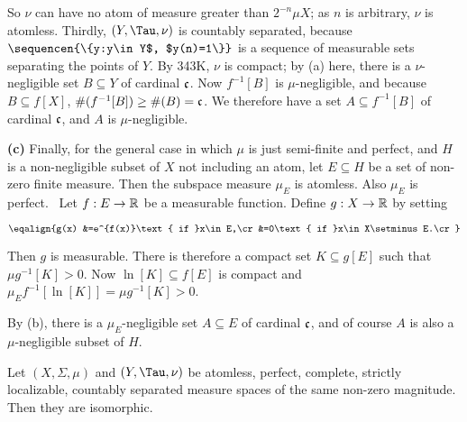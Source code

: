 {

\noindent So $\nu$ can have no atom of measure greater than $2^{-n}\mu X$; 
as $n$ is arbitrary, $\nu$ is atomless.   Thirdly, $(Y,\Tau,\nu)$ is
countably separated, because $\sequencen{\{y:y\in Y$, $y(n)=1\}}$ is a
sequence of measurable sets separating the points of $Y$.   By 343K, $\nu$
is compact;  by (a) here, there is a $\nu$-negligible set $B\subseteq Y$ of
cardinal $\frak c$.   Now $f^{-1}[B]$ is $\mu$-negligible, and because
$B\subseteq f[X]$, $\#(f^{-1}[B])\ge\#(B)=\frak c$.   We therefore have a
set $A\subseteq f^{-1}[B]$ of cardinal $\frak c$, and $A$ is
$\mu$-negligible.

\medskip

{\bf (c)} Finally, for the general case in which $\mu$ is just semi-finite
and perfect, and $H$ is a non-negligible subset of $X$ not including an
atom, let $E\subseteq H$ be a set of non-zero finite
measure.   Then the subspace measure $\mu_E$ is
atomless.   Also $\mu_E$ is perfect.   \Prf\ Let $f:E\to\Bbb R$ be a
measurable function.   Define $g:X\to\Bbb R$ by setting 

$$\eqalign{g(x)
&=e^{f(x)}\text{ if }x\in E,\cr
&=0\text{ if }x\in X\setminus E.\cr}$$

\noindent Then $g$ is measurable.   There is therefore a compact set
$K\subseteq g[E]$ such that $\mu g^{-1}[K]>0$.   Now 
$\ln[K]\subseteq f[E]$ is compact and 
$\mu_Ef^{-1}[\ln[K]]=\mu g^{-1}[K]>0$.\ \Qed

By (b), there is a $\mu_E$-negligible
set $A\subseteq E$ of cardinal $\frak c$, and of course $A$ is also a
$\mu$-negligible subset of $H$.
}%


 Let $(X,\Sigma,\mu)$ and $(Y,\Tau,\nu)$
be atomless, perfect, complete, strictly localizable, countably
separated measure spaces of the same non-zero magnitude.   Then they are
isomorphic.

